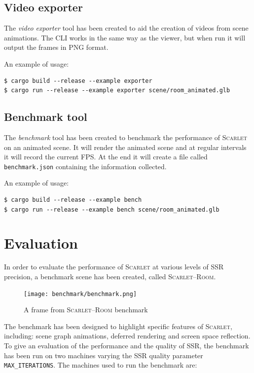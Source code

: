 \documentclass[11pt,a4paper]{report}
\begin{document}
\section{Video exporter}
The \textit{video exporter} tool has been created to aid the creation of videos from scene animations. The CLI works in the same way as the viewer, but when run it will output the frames in PNG format.

An example of usage:
\begin{verbatim}
$ cargo build --release --example exporter
$ cargo run --release --example exporter scene/room_animated.glb
\end{verbatim}

\section{Benchmark tool}
The \textit{benchmark} tool has been created to benchmark the performance of \textsc{Scarlet} on an animated scene. It will render the animated scene and at regular intervals it will record the current FPS. At the end it will create a file called \texttt{benchmark.json} containing the information collected.

An example of usage:
\begin{verbatim}
$ cargo build --release --example bench
$ cargo run --release --example bench scene/room_animated.glb
\end{verbatim}

\chapter{Evaluation}
In order to evaluate the performance of \textsc{Scarlet} at various levels of SSR precision, a benchmark scene has been created, called \textsc{Scarlet--Room}.

\begin{figure}[htp]
	\centering
	\texttt{[image: benchmark/benchmark.png]}
	\caption{A frame from \textsc{Scarlet--Room} benchmark}
	\label{eval:example}
\end{figure}

The benchmark has been designed to highlight specific features of \textsc{Scarlet}, including: scene graph animations, deferred rendering and screen space reflection. To give an evaluation of the performance and the quality of SSR, the benchmark has been run on two machines varying the SSR quality parameter \texttt{MAX\_ITERATIONS}. The machines used to run the benchmark are:
\end{document}
